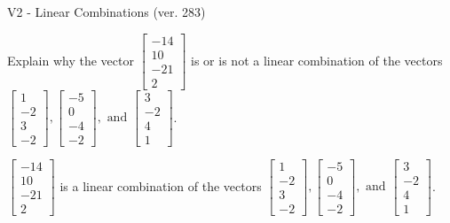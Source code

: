 \begin{exercise}
  \begin{exerciseTitle}V2 - Linear Combinations (ver. 283)\end{exerciseTitle}
  \begin{exerciseStatement}
    Explain why the vector \(\left[\begin{array}{c}
-14 \\
10 \\
-21 \\
2
\end{array}\right]\)  is or is not a linear 
	combination of the vectors \(\left[\begin{array}{c}
1 \\
-2 \\
3 \\
-2
\end{array}\right] , \left[\begin{array}{c}
-5 \\
0 \\
-4 \\
-2
\end{array}\right] , \text{ and } \left[\begin{array}{c}
3 \\
-2 \\
4 \\
1
\end{array}\right]\).
	


  \end{exerciseStatement}
  \begin{exerciseAnswer}
   \(\left[\begin{array}{c}
-14 \\
10 \\
-21 \\
2
\end{array}\right]\) 
  	 is  
	a linear combination of the vectors \(\left[\begin{array}{c}
1 \\
-2 \\
3 \\
-2
\end{array}\right] , \left[\begin{array}{c}
-5 \\
0 \\
-4 \\
-2
\end{array}\right] , \text{ and } \left[\begin{array}{c}
3 \\
-2 \\
4 \\
1
\end{array}\right]\).

	
  


  \end{exerciseAnswer}
\end{exercise}